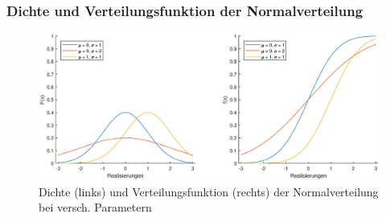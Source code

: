 
\begin{frame}
\frametitle{Dichte und Verteilungsfunktion der Normalverteilung}
\begin{figure}[hbtp]
\centering
\includegraphics[scale=0.5]{images/plot_normal_dist.eps}
\caption{Dichte (links) und Verteilungsfunktion (rechts) der Normalverteilung bei versch. Parametern}
\end{figure}
\end{frame}


